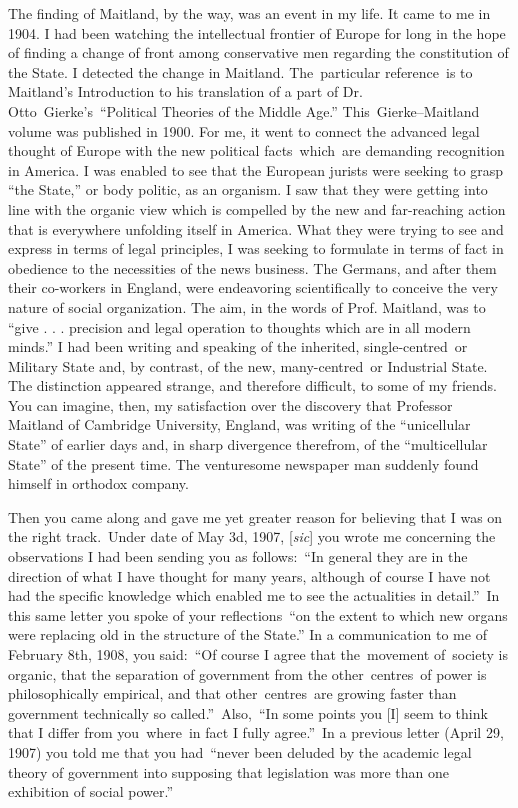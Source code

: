 \documentclass[twoside,symmetric,nobib,justified]{tufte-book}
\begin{document}
The finding of Maitland, by the way, was an event in my life. It came to
me in 1904. I had been watching the intellectual frontier of Europe for
long in the hope of finding a change of front among conservative men
regarding the constitution of the State. I detected the change in
Maitland. The~particular reference~is to Maitland's Introduction to his
translation of a part of Dr. Otto~Gierke's~``Political Theories of the
Middle Age.'' This~Gierke--Maitland volume was published in 1900. For
me, it went to connect the advanced legal thought of Europe with the new
political facts~which~are demanding recognition in America. I was
enabled to see that the European jurists were seeking to grasp ``the
State,'' or body politic, as an organism. I saw that they were getting
into line with the organic view which is compelled by the new and
far-reaching action that is everywhere unfolding itself in America. What
they were trying to see and express in terms of legal principles, I was
seeking to formulate in terms of fact in obedience to the necessities of
the news business. The Germans, and after them their co-workers in
England, were endeavoring scientifically to conceive the very nature of
social organization. The aim, in the words of Prof. Maitland, was to
``give . . . precision and legal operation to thoughts which are in all
modern minds.'' I had been writing and speaking of the inherited,
single-centred~or Military State and, by contrast, of the new,
many-centred~or Industrial State. The distinction appeared strange, and
therefore difficult, to some of my friends. You can imagine, then, my
satisfaction over the discovery that Professor Maitland of Cambridge
University, England, was writing of the ``unicellular State'' of earlier
days and, in sharp divergence therefrom, of the ``multicellular State''
of the present time. The venturesome newspaper man suddenly found
himself in orthodox company.~

Then you came along and gave me yet greater reason for believing that I
was on the right track.~Under date of May 3d, 1907, {[}\emph{sic}{]} you
wrote me concerning the observations I had been sending you as
follows:~``In general they are in the direction of what I have thought
for many years, although of course I have not had the specific knowledge
which enabled me to see the actualities in detail.''~In this same letter
you spoke of your reflections~``on the extent to which new organs were
replacing old in the structure of the State.'' In a communication to me
of February 8th, 1908, you said:~``Of course I agree that the~movement
of~society is organic, that the separation of government from the
other~centres~of power is philosophically empirical, and that
other~centres~are growing faster than government technically so
called.''~Also,~``In some points you {[}I{]} seem to think that I differ
from you~where~in fact I fully agree.''~In a previous letter (April 29,
1907) you told me that you had~``never been deluded by the academic
legal theory of government into supposing that legislation was more than
one exhibition of social power.''
\end{document}
